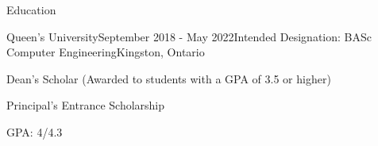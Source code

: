 \documentclass{resume} %
\begin{document}

\begin{rSection}{Education}

\begin{rSubsection}{Queen's University}{September 2018 - May 2022}{Intended
    Designation: BASc Computer Engineering}{Kingston, Ontario}
\item Dean's Scholar (Awarded to students with a GPA of 3.5 or higher)
\item Principal's Entrance Scholarship
\item GPA: 4/4.3
\end{rSubsection}
\end{rSection}

\end{document}
